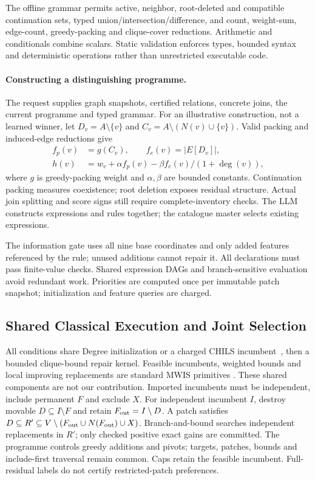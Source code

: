 The offline grammar permits active, neighbor, root-deleted and compatible
continuation sets, typed union/intersection/difference, and count, weight-sum,
edge-count, greedy-packing and clique-cover reductions. Arithmetic and
conditionals combine scalars. Static validation enforces types, bounded syntax
and deterministic operations rather than unrestricted executable code.

\paragraph{Constructing a distinguishing programme.}
The request supplies graph snapshots, certified relations, concrete joins,
the current programme and typed grammar. For an illustrative construction,
not a learned winner, let $D_v=A\setminus\{v\}$ and
$C_v=A\setminus(N(v)\cup\{v\})$. Valid packing and induced-edge reductions give
\begin{equation}
 \begin{aligned}
 f_p(v)&=g(C_v),\qquad f_e(v)=|E[D_v]|,\\
 h(v)&=w_v+\alpha f_p(v)-\beta f_e(v)/(1+\deg(v)),
 \end{aligned}
 \label{eq:typed-construction}
\end{equation}
where $g$ is greedy-packing weight and $\alpha,\beta$ are bounded constants.
Continuation packing measures coexistence; root deletion exposes residual
structure. Actual join splitting and score signs still require complete-inventory
checks. The LLM constructs expressions and rules together; the catalogue
master selects existing expressions.

The information gate uses all nine base coordinates and only added features
referenced by the rule; unused additions cannot repair it. All declarations
must pass finite-value checks. Shared expression DAGs and branch-sensitive
evaluation avoid redundant work. Priorities are computed once per immutable
patch snapshot; initialization and feature queries are charged.

\subsection{Shared Classical Execution and Joint Selection}
\label{sec:method:execution}
All conditions share Degree initialization or a charged CHILS
incumbent~\cite{grossmann2025chils}, then a bounded clique-bound repair kernel.
Feasible incumbents, weighted bounds and local improving replacements are
standard MWIS primitives
\cite{lamm2019weighted,gellner2021struction,grossmann2024mmwis}.
These shared components are not our contribution. Imported incumbents must
be independent, include
permanent $F$ and exclude $X$.
For independent incumbent $I$, destroy movable $D\subseteq I\setminus F$ and
retain $F_{\rm out}=I\setminus D$. A patch satisfies
$D\subseteq R'\subseteq V\setminus(F_{\rm out}\cup N(F_{\rm out})\cup X)$.
Branch-and-bound searches independent replacements in $R'$; only checked
positive exact gains are committed. The programme controls greedy additions
and pivots; targets, patches, bounds and include-first traversal remain common.
Caps retain the feasible incumbent.
Full-residual labels do not certify restricted-patch preferences.

